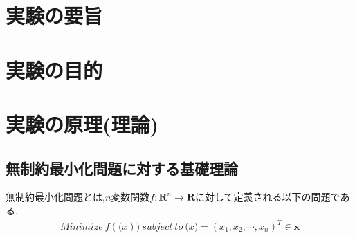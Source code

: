 \documentclass[12pt]{jarticle}
\begin{document}
\section{実験の要旨}

\section{実験の目的}
\section{実験の原理(理論)}
\subsection{無制約最小化問題に対する基礎理論}
無制約最小化問題とは,$n$変数関数$f:\boldsymbol{R}^n \rightarrow \boldsymbol{R}$に対して定義される以下の問題である.
\begin{eqnarray}
    Minimize\ f(\boldsymbol(x))\ subject\ to\ \boldsymbol(x)=(x_1,x_2,\cdots,x_n)^T \in \boldsymbol{x}\nonumber
\end{eqnarray}
\end{document}

